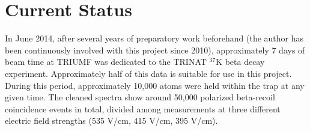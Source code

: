 %
%

%
\section{Current Status}
\label{status}
In June 2014, after several years of preparatory work beforehand (the author has been continuously involved with this project since 2010), approximately 7 days of beam time at TRIUMF was dedicated to the TRINAT $^{37}\textrm{K}$ beta decay experiment.  Approximately half of this data is suitable for use in this project.  During this period, approximately 10,000 atoms were held within the trap at any given time.  The cleaned spectra show around 50,000 polarized beta-recoil coincidence events in total, divided among measurements at three different electric field strengths (535 V/cm, 415 V/cm, 395 V/cm). 

